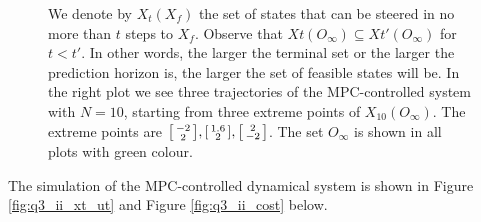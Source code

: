\documentclass[a4paper,11pt,reqno]{amsart}
\begin{document}
\begin{figure}[H]
    \captionsetup{justification   = raggedright,
              singlelinecheck = false}
    \caption{We denote by $X_t(X_f)$ the set of states that can be steered in no more than $t$
    steps to $X_f$. Observe that $Xt(O_{\infty})\subseteq Xt'(O_{\infty})$ for $t < t'$. In
    other words, the larger the terminal set or the larger the prediction horizon is, the larger
    the set of feasible states will be. In the right plot we see three trajectories of the
    MPC-controlled system with $N = 10$, starting from three extreme points of $X_{10}(O_\infty)$. The extreme points are $\begin{bsmallmatrix}-2\\2\end{bsmallmatrix}, \begin{bsmallmatrix}1.6\\2\end{bsmallmatrix}, \begin{bsmallmatrix}2\\-2\end{bsmallmatrix}$. The set
    $O_{\infty}$ is shown in all plots with green colour.
    \label{fig:q3_ii_Xx}}
\end{figure}
The simulation of the MPC-controlled dynamical system is shown in Figure \ref{fig:q3_ii_xt_ut} and Figure \ref{fig:q3_ii_cost} below.
\end{document}
